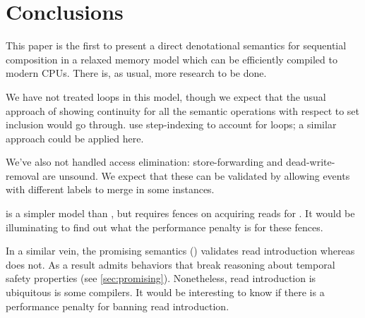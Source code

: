 \section{Conclusions} %

This paper is the first to present a direct denotational semantics for
sequential composition in a relaxed memory model which can be
efficiently compiled to modern CPUs. There is, as usual, more research
to be done.

We have not treated loops in this model, though we expect that the usual
approach of showing continuity for all the semantic operations with respect
to set inclusion would go through. \citet{DBLP:conf/esop/PaviottiCPWOB20} use
step-indexing to account for loops; a similar approach could be applied here.

We've also not handled access elimination: store-forwarding and
dead-write-removal are unsound.  We expect that these can be validated by
allowing events with different labels to merge in some instances.

 is a simpler model than , but requires fences on
acquiring reads for \armeight{}.  It would be illuminating to find out what
the performance penalty is for these fences.

In a similar vein, the promising semantics (\PS{}) validates read
introduction whereas \PwTmca{} does not.  As a result \PS{} admits behaviors
that break reasoning about temporal safety properties (see
\textsection\ref{sec:promising}).  Nonetheless, read introduction is
ubiquitous is some compilers.  It would be interesting to know if there is a
performance penalty for banning read introduction.





